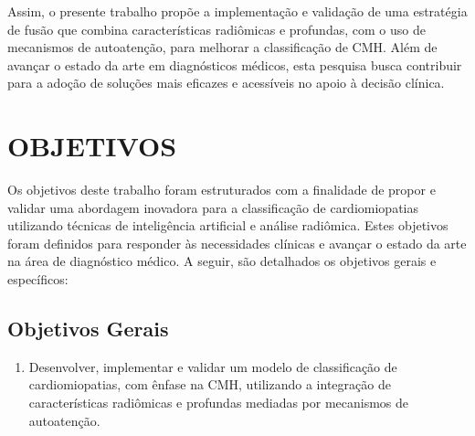 
Assim, o presente trabalho propõe a implementação e validação de uma estratégia de fusão que combina características radiômicas e profundas, com o uso de mecanismos de autoatenção, para melhorar a classificação de \gls{CMH}. Além de avançar o estado da arte em diagnósticos médicos, esta pesquisa busca contribuir para a adoção de soluções mais eficazes e acessíveis no apoio à decisão clínica.

\newpage

\section{OBJETIVOS}
\label{sec:cap1_objetivo}


Os objetivos deste trabalho foram estruturados com a finalidade de propor e validar uma abordagem inovadora para a classificação de cardiomiopatias utilizando técnicas de inteligência artificial e análise radiômica. Estes objetivos foram definidos para responder às necessidades clínicas e avançar o estado da arte na área de diagnóstico médico. A seguir, são detalhados os objetivos gerais e específicos:

\subsection{Objetivos Gerais}
\label{subsec:cap1_objetivo_geral}

\begin{enumerate}
\item Desenvolver, implementar e validar um modelo de classificação de cardiomiopatias, com ênfase na \gls{CMH}, utilizando a integração de características radiômicas e profundas mediadas por mecanismos de autoatenção.
\end{enumerate}

